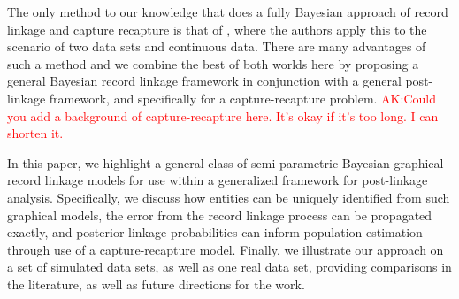 \documentclass[11pt]{article}
\begin{document}
The only method to our knowledge that does a fully Bayesian approach of record linkage and capture recapture is that of \citep{LiseoTancredi11}, where the authors apply this to the scenario of two data sets and continuous data. There are many advantages of such a method and we combine the best of both worlds here by proposing a general Bayesian record linkage framework in conjunction with a general post-linkage framework, and specifically for a capture-recapture problem. 
\textcolor{red}{AK:Could you add a background of capture-recapture here. It's okay if it's too long. I can shorten it.}

In this paper, we highlight a general class of semi-parametric Bayesian graphical record linkage models for use within a generalized framework for post-linkage analysis. Specifically, we discuss how entities can be uniquely identified from such graphical models, the error from the record linkage process can be propagated exactly, and posterior linkage probabilities can inform population estimation through use of a capture-recapture model. Finally, we illustrate our approach on a set of simulated data sets, as well as one real data set, providing comparisons in the literature, as well as future directions for the work.

\end{document}
